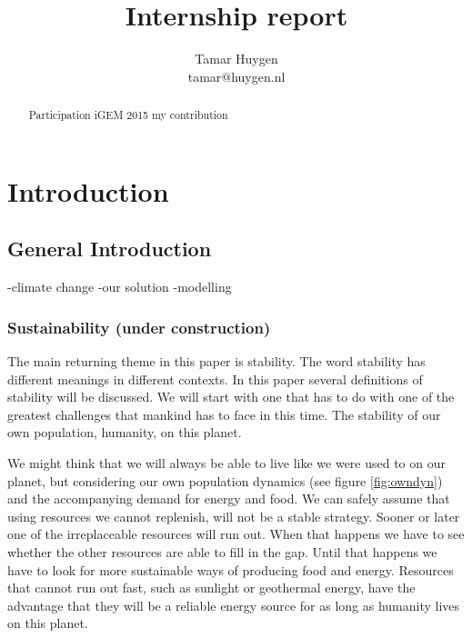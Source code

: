 \documentclass[10pt]{report}
\title{Internship report}
\author{Tamar Huygen \\ tamar@huygen.nl}
\begin{document}
\maketitle

\begin{abstract}
  Participation iGEM 2015 my contribution
\end{abstract}

\chapter{Introduction}

\section*{General Introduction}


-climate change
-our solution
-modelling

\subsection{Sustainability (under construction)}\label{sec:sus}
The main returning theme in this paper is stability. The word stability has 
different meanings in different contexts. In this paper several definitions of 
stability will be discussed. We will start with one that has to do with one of 
the greatest challenges that mankind has to face in this time. The stability of 
our own population, humanity, on this planet.

We might think that we will always be able to live like we were used to on our 
planet, but considering our own population dynamics (see figure 
\ref{fig:owndyn}) and the accompanying demand for energy and food. We can safely 
assume that using resources we cannot replenish, will not be a stable strategy. 
Sooner or later one of the irreplaceable resources will run out. When that 
happens we have to see whether the other resources are able to fill in the gap. 
Until that happens we have to look for more sustainable ways of producing food 
and energy. Resources that cannot run out fast, such as sunlight or geothermal 
energy, have the advantage that they will be a reliable energy source for as 
long as humanity lives on this planet.
\end{document}
